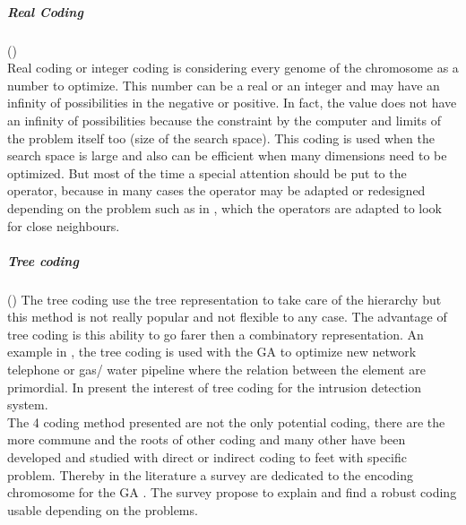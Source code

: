 \subparagraph*{Real Coding }(\cite{ 73*wright1991, 123*owais2008,131*walters1995})   
\\Real coding or integer coding is considering every genome of the chromosome as a number to optimize. This number can be a real or an integer and may have an infinity of possibilities in the negative or positive. In fact, the value does not have an infinity of possibilities because the constraint by the computer and limits of the problem itself too (size of the search space). This coding is used when the search space is large and also can be efficient when many dimensions need to be optimized. But most of the time a special attention should be put to the operator, because in many cases the operator may be adapted or redesigned depending on the problem such as in \cite{68*muhlenbein1989},  which the operators are adapted to look for close neighbours.\\
\subparagraph*{Tree coding }(\cite{ 113*mais2010, 123*owais2008, 131*walters1995})   
The tree coding use the tree representation to take care of the hierarchy but this method is not really popular and not flexible to any case. The advantage of tree coding is this ability to go farer then a combinatory representation.  An example in \cite{131*walters1995}, the tree coding is used with the GA to optimize new network telephone or gas/ water pipeline where the relation between the element are primordial. In \cite{131*walters1995} present the interest of tree coding for  the intrusion detection system. 
\\
The 4 coding method presented are not the only potential coding, there are the more commune and the roots of other coding   and many other have been developed and studied with direct or indirect coding to feet  with specific problem. Thereby in the literature a survey are dedicated to the encoding chromosome for the GA \cite{121*ronald1997}. The survey \cite{121*ronald1997} propose to explain and find a robust coding usable depending on the problems. 
\\





